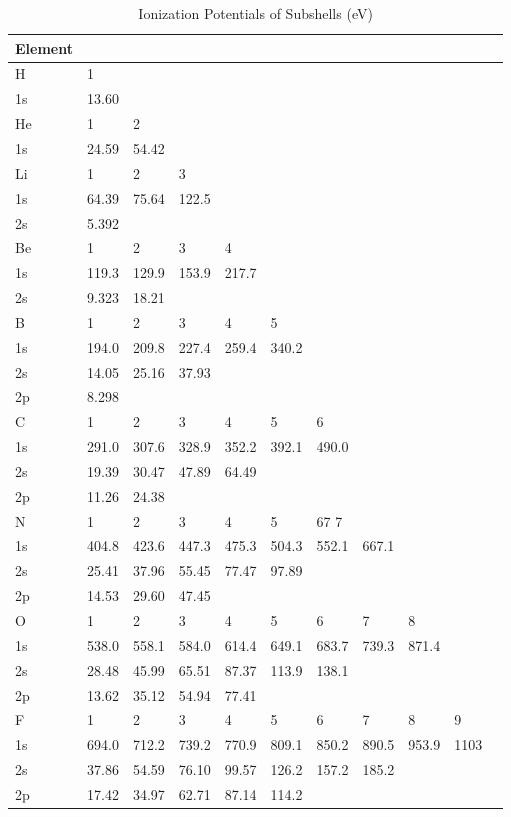 \begin{table}
\begin{center}
\label{tab:SubshellIonizationPotentials}
\caption{Ionization Potentials of Subshells (eV)}
\begin{tabular}{lllllllllll}
\hline
Element\\
\hline
H&    1\\
\hline
1s& 13.60\\
\hline
He&   1&   2\\
\hline
1s& 24.59& 54.42\\
\hline
Li&   1&   2&   3\\
\hline
1s& 64.39& 75.64& 122.5\\
2s& 5.392\\
\hline
Be&   1&   2&   3&   4\\
\hline
1s& 119.3& 129.9& 153.9& 217.7\\
2s& 9.323& 18.21\\
\hline
B& 1&   2&   3&   4&   5\\
\hline
1s& 194.0& 209.8& 227.4& 259.4& 340.2\\
2s& 14.05& 25.16& 37.93\\
2p& 8.298\\
\hline
C&    1&   2&   3&   4&   5&   6\\
\hline
1s& 291.0& 307.6& 328.9& 352.2& 392.1& 490.0\\
2s& 19.39& 30.47& 47.89& 64.49\\
2p& 11.26& 24.38\\
\hline
N&    1&   2&   3&   4&   5&   67   7\\
\hline
1s& 404.8&
423.6& 447.3& 475.3& 504.3& 552.1& 667.1\\
2s& 25.41& 37.96& 55.45& 77.47& 97.89\\
2p& 14.53&
29.60& 47.45\\
\hline
O& 1& 2& 3& 4& 5& 6& 7& 8\\
\hline
1s& 538.0& 558.1& 584.0& 614.4&
649.1& 683.7& 739.3& 871.4\\
2s& 28.48& 45.99& 65.51& 87.37& 113.9& 138.1\\
2p& 13.62& 35.12&
54.94& 77.41\\
\hline
F&    1&   2&   3&   4&   5&   6&   7&   8&   9\\
\hline
1s& 694.0& 712.2& 739.2& 770.9&
809.1& 850.2& 890.5& 953.9&  1103\\
2s& 37.86& 54.59& 76.10& 99.57& 126.2& 157.2& 185.2\\
2p& 17.42& 34.97& 62.71& 87.14& 114.2\\
\hline
\end{tabular}
\end{center}
\end{table}



